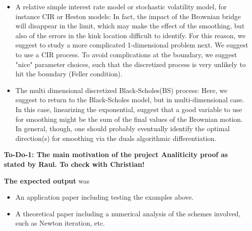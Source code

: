 \documentclass[11pt]{article}
\begin{document}
\begin{itemize}
\begin{itemize}
		\item A relative simple interest rate model or stochastic volatility model, for instance CIR or Heston models: In fact,  the impact of the Brownian bridge will disappear in the limit, which may make the effect of the smoothing, 	but also of the errors in the kink location difficult to identify. For 	this reason, we suggest to study a more complicated 1-dimensional 	problem next. We suggest to use a CIR process. To avoid complications at the boundary, we suggest "nice" parameter choices, such that the discretized process is very unlikely to hit the boundary (Feller
		condition).
		\item The multi dimensional discretized Black-Scholes(BS) process: Here, we suggest to
		return to the Black-Scholes model, but in multi-dimensional case. In this case,	linearizing the exponential, suggest that a good variable to use for smoothing might be the sum of the final values of the Brownian motion.
		In general, though, one should probably eventually identify the	optimal direction(s) for smoothing via the duals algorithmic	differentiation.
	\end{itemize}
\end{itemize}



\textbf{To-Do-1: The main motivation of the project Analiticity proof as stated by Raul. To check with Christian!}

\textbf{The expected output} was 
\begin{itemize}
	\item An application paper including testing the examples above.
	\item A theoretical paper including a numerical analysis of the schemes involved, such as Newton iteration, etc.
\end{itemize}
\end{document}

